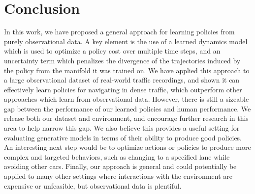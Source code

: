 \documentclass{article} %
\begin{document}


  \section{Conclusion}

  In this work, we have proposed a general approach for learning policies from purely observational data. A key element is the use of a learned dynamics model which is used to optimize a policy cost over multiple time steps, and an uncertainty term which penalizes the divergence of the trajectories induced by the policy from the manifold it was trained on.
  We have applied this approach to a large observational dataset of real-world traffic recordings, and shown it can effectively learn policies for navigating in dense traffic, which outperform other approaches which learn from observational data.
  However, there is still a sizeable gap between the performance of our learned policies and human performance.
  We release both our dataset and environment, and encourage further research in this area to help narrow this gap.
  We also believe this provides a useful setting for evaluating generative models in terms of their ability to produce good policies.
  An interesting next step would be to optimize actions or policies to produce more complex and targeted behaviors, such as changing to a specified lane while avoiding other cars.
  Finally, our approach is general and could potentially be applied to many other settings where interactions with the environment are expensive or unfeasible, but observational data is plentiful.







\appendix
\end{document}
